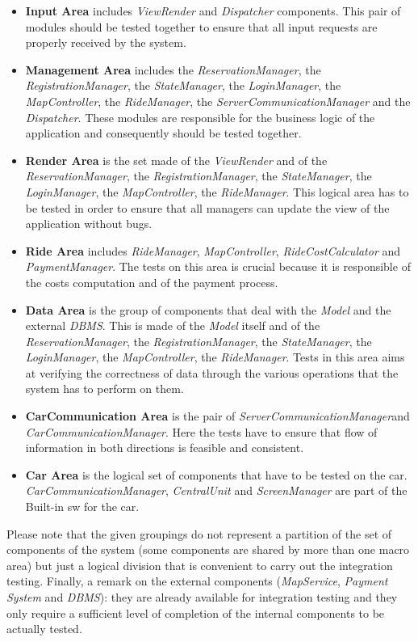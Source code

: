\documentclass[11pt,a4paper]{report}
\begin{document}
\begin{itemize}
\item \textbf{Input Area} includes \textit{ViewRender} and \textit{Dispatcher} components. This pair of modules should be tested together to ensure that all input requests are properly received by the system.
\item \textbf{Management Area} includes the \textit{ReservationManager}, the \textit{RegistrationManager}, the \textit{StateManager}, the \textit{LoginManager}, the \textit{MapController}, the \textit{RideManager}, the \textit{ServerCommunicationManager} and the \textit{Dispatcher}. These modules are responsible for the business logic of the application and consequently should be tested together.
\item \textbf{Render Area} is the set made of the \textit{ViewRender} and of the \textit{ReservationManager}, the \textit{RegistrationManager}, the \textit{StateManager}, the \textit{LoginManager}, the \textit{MapController}, the \textit{RideManager}. This logical area has to be tested in order to ensure that all managers can update the view of the application without bugs.
\item \textbf{Ride Area} includes \textit{RideManager},  \textit{MapController}, \textit{RideCostCalculator} and \textit{PaymentManager}. The tests on this area is crucial because it is responsible of the costs computation and of the payment process.
\item \textbf{Data Area} is the group of components that deal with the \textit{Model} and the external \textit{DBMS}. This is made of the \textit{Model} itself and of the \textit{ReservationManager}, the \textit{RegistrationManager}, the \textit{StateManager}, the \textit{LoginManager}, the \textit{MapController}, the \textit{RideManager}. Tests in this area aims at verifying the correctness of data through the various operations that the system has to perform on them.
\item \textbf{CarCommunication Area} is the pair of \textit{ServerCommunicationManager}and \textit{CarCommunicationManager}. Here the tests have to ensure that flow of information in both directions is feasible and consistent.
\item \textbf{Car Area} is the logical set of components that have to be tested on the car. \textit{CarCommunicationManager}, \textit{CentralUnit} and \textit{ScreenManager} are part of the Built-in sw for the car. 
\end{itemize}
Please note that the given groupings do not represent a partition of the set of components of the system (some components are shared by more than one macro area) but just a logical division that is convenient to carry out the integration testing. 
Finally, a remark on the external components (\textit{MapService}, \textit{Payment System} and \textit{DBMS}): they are already available for integration testing and they only require a sufficient level of completion of the internal components to be actually tested.
\end{document}
